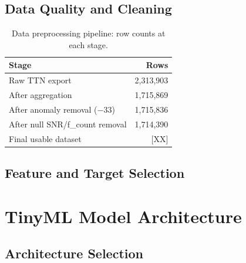 \subsection{Data Quality and Cleaning}

\begin{table}[H]
  \centering
  \caption{Data preprocessing pipeline: row counts at each stage.}
  \label{tab:data-cleaning}
  \begin{tabular}{lr}
    \toprule
    \textbf{Stage} & \textbf{Rows} \\
    \midrule
    Raw TTN export                    & 2,313,903 \\
    After aggregation                 & 1,715,869 \\
    After anomaly removal ($-33$)     & 1,715,836 \\
    After null SNR/f\_count removal   & 1,714,390 \\
    Final usable dataset              & [XX] \\
    \bottomrule
  \end{tabular}
\end{table}

\subsection{Feature and Target Selection}

\section{TinyML Model Architecture}
\label{sec:model-arch}

\subsection{Architecture Selection}

